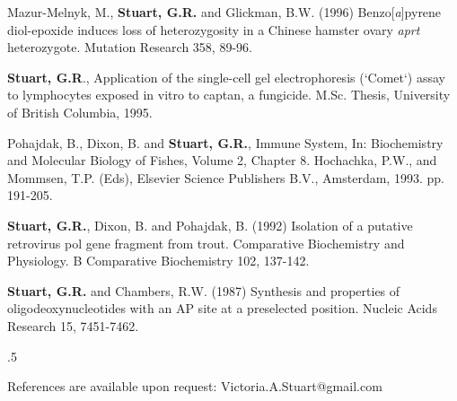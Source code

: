 \documentclass[margin]{res} %
\begin{document}
\begin{resume}
Mazur-Melnyk, M., \textbf{Stuart, G.R.} and Glickman, B.W. (1996) Benzo[\textit{a}]pyrene diol-epoxide induces loss of heterozygosity in a Chinese hamster ovary \textit{aprt} heterozygote. Mutation Research 358, 89-96.

\textbf{Stuart, G.R}., Application of the single-cell gel electrophoresis (`Comet`) assay to lymphocytes exposed in vitro to captan, a fungicide. M.Sc. Thesis, University of British Columbia, 1995.

Pohajdak, B., Dixon, B. and \textbf{Stuart, G.R.}, Immune System, In: Biochemistry and Molecular Biology of Fishes, Volume 2, Chapter 8. Hochachka, P.W., and Mommsen, T.P. (Eds), Elsevier Science Publishers B.V., Amsterdam, 1993. pp. 191-205.

\textbf{Stuart, G.R.}, Dixon, B. and Pohajdak, B. (1992) Isolation of a putative retrovirus pol gene fragment from trout. Comparative Biochemistry and Physiology. B Comparative Biochemistry 102, 137-142.

\textbf{Stuart, G.R.} and Chambers, R.W. (1987) Synthesis and properties of oligodeoxynucleotides with an AP site at a preselected position. Nucleic Acids Research 15, 7451-7462.




\vspace{1.5cm} %

\moveleft.5\hoffset\centerline{\large\bf \color{blue}{References}} %
 

References are available upon request: Victoria.A.Stuart@gmail.com


\end{resume}
\end{document}
